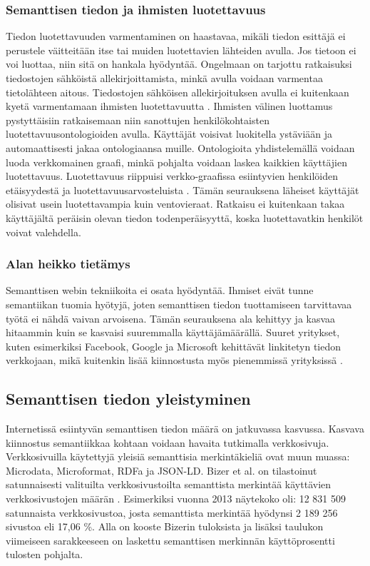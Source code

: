 \documentclass[finnish, 12pt, a4paper, elec, utf8, pdfa, online]{aaltothesis}
\begin{document}
{\subsubsection{Semanttisen tiedon ja ihmisten luotettavuus}
Tiedon luotettavuuden varmentaminen on haastavaa, mikäli tiedon esittäjä ei perustele väitteitään itse tai muiden luotettavien lähteiden avulla. Jos tietoon ei voi luottaa, niin sitä on hankala hyödyntää. Ongelmaan on tarjottu ratkaisuksi tiedostojen sähköistä allekirjoittamista, minkä avulla voidaan varmentaa tietolähteen aitous. Tiedostojen sähköisen allekirjoituksen avulla ei kuitenkaan kyetä varmentamaan ihmisten luotettavuutta \cite{trust}. Ihmisten välinen luottamus pystyttäisiin ratkaisemaan niin sanottujen henkilökohtaisten luotettavuusontologioiden avulla. Käyttäjät voisivat luokitella ystäviään ja automaattisesti jakaa ontologiaansa muille. Ontologioita yhdistelemällä voidaan luoda verkkomainen graafi, minkä pohjalta voidaan laskea kaikkien käyttäjien luotettavuus.
Luotettavuus riippuisi verkko-graafissa esiintyvien henkilöiden etäisyydestä ja luotettavuusarvosteluista \cite{trust}. Tämän seurauksena läheiset käyttäjät olisivat usein luotettavampia kuin ventovieraat. Ratkaisu ei kuitenkaan takaa käyttäjältä peräisin olevan tiedon todenperäisyyttä, koska luotettavatkin henkilöt voivat valehdella.

\subsubsection{Alan heikko tietämys}
Semanttisen webin tekniikoita ei osata hyödyntää. Ihmiset eivät tunne semantiikan tuomia hyötyjä, joten semanttisen tiedon tuottamiseen tarvittavaa työtä ei nähdä vaivan arvoisena. Tämän seurauksena ala kehittyy ja kasvaa hitaammin kuin se kasvaisi suuremmalla käyttäjämäärällä. Suuret yritykset, kuten esimerkiksi Facebook, Google ja Microsoft kehittävät linkitetyn tiedon verkkojaan, mikä kuitenkin lisää kiinnostusta myös pienemmissä yrityksissä \cite{Facebook} \cite{knowledge_graph} \cite{cortana}.


\subsection{Semanttisen tiedon yleistyminen}
Internetissä esiintyvän semanttisen tiedon määrä on jatkuvassa kasvussa. Kasvava kiinnostus semantiikkaa kohtaan voidaan havaita tutkimalla verkkosivuja. Verkkosivuilla käytettyjä yleisiä semanttisia merkintäkieliä ovat muun muassa: Microdata, Microformat, RDFa ja JSON-LD. Bizer et al. on tilastoinut satunnaisesti valituilta verkkosivustoilta semanttista merkintää käyttävien verkkosivustojen määrän \cite{rdfa_usage}. Esimerkiksi vuonna 2013 näytekoko oli: 12 831 509 satunnaista verkkosivustoa, josta semanttista merkintää hyödynsi 2 189 256 sivustoa eli 17,06 \%. Alla on kooste Bizerin tuloksista ja lisäksi taulukon viimeiseen sarakkeeseen on laskettu semanttisen merkinnän käyttöprosentti tulosten pohjalta.

}
\end{document}
